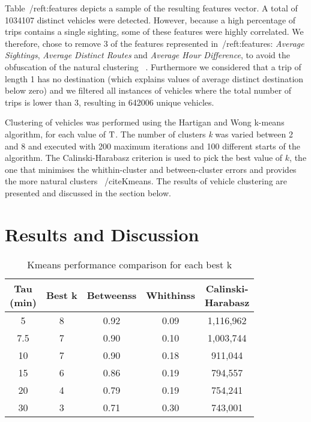 Table~/ref{t:features} depicts a sample of the resulting features vector. A total of 1034107 distinct vehicles were detected. However, because a high percentage of trips contains a single sighting, some of these features were highly correlated. We therefore, chose to remove 3 of the features represented in~/ref{t:features}: \emph{Average Sightings}, \emph{Average Distinct Routes} and \emph{Average Hour Difference}, to avoid the obfuscation of the natural clustering ~\cite{Kmeans}. Furthermore we considered that a trip of length 1 has no destination (which explains values of average distinct destination below zero) and we filtered all instances of vehicles where the total number of trips is lower than 3, resulting in 642006 unique vehicles.

Clustering of vehicles was performed using the Hartigan and Wong k-means algorithm, for each value of $\mathrm{T}$. The number of clusters \emph{k} was varied between 2 and 8 and executed with 200 maximum iterations and 100 different starts of the algorithm. The Calinski-Harabasz criterion is used to pick the best value of $k$, the one that minimises the whithin-cluster and between-cluster errors and provides the more natural clusters ~/cite{Kmeans}. The results of vehicle clustering are presented and discussed in the section below.



\section{Results and Discussion}\label{s.results}



\begin{table}[ht]
\centering
\begin{tabular}{c c c c c}
  \hline
\thead{Tau\\(min)} & Best k & Betweenss & Whithinss & \thead{Calinski-\\Harabasz} \\
  \hline
5 &   8 & 0.92 & 0.09 & 1,116,962 \\
  7.5 &   7 & 0.90 & 0.10 & 1,003,744 \\
  10 &   7 & 0.90 & 0.18 &   911,044 \\
  15 &   6 & 0.86 & 0.19 &   794,557 \\
  20 &   4 & 0.79 & 0.19 &   754,241 \\
  30 &   3 & 0.71 & 0.30 &   743,001 \\
   \hline
\end{tabular}
\caption{Kmeans performance comparison for each best k }
\label{t:tau_comparison}
\end{table}


